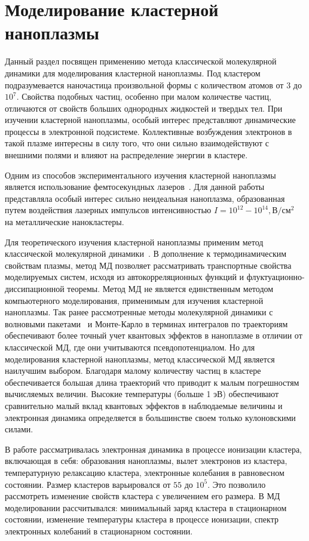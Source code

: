 \chapter{Моделирование кластерной наноплазмы}
Данный раздел посвящен применению метода классической молекулярной динамики для моделирования кластерной наноплазмы.  Под кластером подразумевается наночастица произвольной формы с количеством атомов от $3$ до $10^7$. Свойства подобных частиц, особенно при малом количестве частиц, отличаются от свойств больших однородных жидкостей и твердых тел.
При изучении кластерной наноплазмы, особый интерес представляют динамические процессы в электронной подсистеме. Коллективные возбуждения электронов в такой плазме интересны в силу того, что они сильно взаимодействуют с внешними полями и влияют на распределение энергии в кластере. 

Одним из способов экспериментального изучения кластерной наноплазмы является использование фемтосекундных лазеров~\cite{Fennel-PRL07,Hickstein-PRL14}.
Для данной работы представляла особый интерес сильно неидеальная наноплазма, образованная путем воздействия лазерных импульсов интенсивностью $I=10^{12} - 10^{14}, \mathrm{\text{В}}/\mathrm{\text{см}}^2$~\cite{Reinholz_PRB06} на металлические нанокластеры.

Для теоретического изучения кластерной наноплазмы применим метод классической молекулярной динамики~\cite{NM-JETP05,RMRM-PRE04,MRRWZ-PRE05}.  В дополнение к термодинамическим свойствам плазмы, метод МД позволяет рассматривать транспортные свойства моделируемых систем, исходя из автокорреляционных функций и флуктуационно-диссипационной теоремы.  Метод МД не является единственным методом компьютерного моделирования, применимым для изучения кластерной наноплазмы. Так ранее рассмотренные методы молекулярной динамики с волновыми пакетами~\cite{GMMV-PRE13} и Монте-Карло в терминах интегралов по траекториям~\cite{filinov2004thermodynamic,Filinov-PRE15} обеспечивают более точный учет квантовых эффектов в наноплазме в отличии от классической МД, где они учитываются псевдопотенциалом. Но для моделирования кластерной наноплазмы, метод классической МД является наилучшим выбором. Благодаря малому количеству частиц в кластере обеспечивается большая длина траекторий что приводит к малым погрешностям вычисляемых величин. Высокие температуры (больше 1 эВ) обеспечивают сравнительно малый вклад квантовых эффектов в наблюдаемые величины и электронная динамика определяется в большинстве своем только кулоновскими силами. 

В работе рассматривалась электронная динамика в процессе ионизации кластера, включающая в себя: образования наноплазмы, вылет электронов из кластера, температурную релаксацию кластера, электронные колебания в равновесном состоянии. Размер кластеров варьировался от $55$ до $10^5$. Это позволило рассмотреть изменение свойств кластера с увеличением его размера.  В МД моделировании рассчитывался: минимальный заряд кластера в стационарном состоянии, изменение температуры кластера в процессе ионизации, спектр электронных колебаний в стационарном состоянии.

